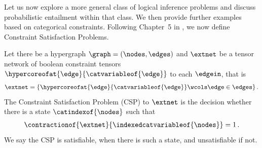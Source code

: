 

Let us now explore a more general class of logical inference problems and discuss probabilistic entailment within that class.
We then provide further examples based on categorical constraints.
Following Chapter~5 in \cite{russell_artificial_2021}, we now define Constraint Satisfaction Problems.

\begin{definition}\label{def:csp}
    Let there be a hypergraph $\graph=(\nodes,\edges)$ and $\extnet$ be a tensor network of boolean constraint tensors $\hypercoreofat{\edge}{\catvariableof{\edge}}$ to each $\edgein$, that is
    \begin{align*}
        \extnet = \{ \hypercoreofat{\edge}{\catvariableof{\edge}} \wcols \edge\in\edges \} \, .
    \end{align*}
    The Constraint Satisfaction Problem (CSP) to $\extnet$ is the decision whether there is a state $\catindexof{\nodes}$ such that
    \begin{align*}
        \contractionof{\extnet}{\indexedcatvariableof{\nodes}} = 1 \, .
    \end{align*}
    We say the CSP is satisfiable, when there is such a state, and unsatisfiable if not.
\end{definition}

